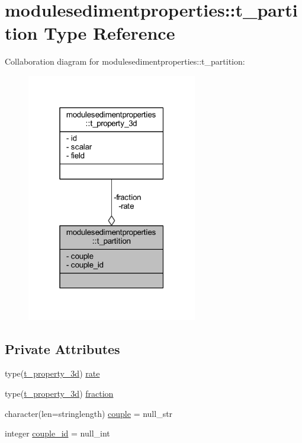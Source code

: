 \hypertarget{structmodulesedimentproperties_1_1t__partition}{}\section{modulesedimentproperties\+:\+:t\+\_\+partition Type Reference}
\label{structmodulesedimentproperties_1_1t__partition}


Collaboration diagram for modulesedimentproperties\+:\+:t\+\_\+partition\+:\nopagebreak
\begin{figure}[H]
\begin{center}
\leavevmode
\includegraphics[width=211pt]{structmodulesedimentproperties_1_1t__partition__coll__graph}
\end{center}
\end{figure}
\subsection*{Private Attributes}
\begin{DoxyCompactItemize}
\item 
type(\mbox{\hyperlink{structmodulesedimentproperties_1_1t__property__3d}{t\+\_\+property\+\_\+3d}}) \mbox{\hyperlink{structmodulesedimentproperties_1_1t__partition_a11c3ad3097cd5a81fb0d7da22351eb8e}{rate}}
\item 
type(\mbox{\hyperlink{structmodulesedimentproperties_1_1t__property__3d}{t\+\_\+property\+\_\+3d}}) \mbox{\hyperlink{structmodulesedimentproperties_1_1t__partition_a73beb3772d1f8dc5286063cff56b1fb5}{fraction}}
\item 
character(len=stringlength) \mbox{\hyperlink{structmodulesedimentproperties_1_1t__partition_af5e153f08b51867f285f45e1af8be97e}{couple}} = null\+\_\+str
\item 
integer \mbox{\hyperlink{structmodulesedimentproperties_1_1t__partition_ab0d2658a007ee928854260feb6641759}{couple\+\_\+id}} = null\+\_\+int
\end{DoxyCompactItemize}


